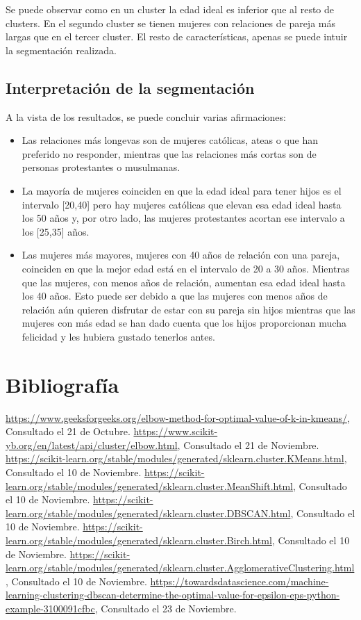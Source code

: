 \documentclass[paper=a4, fontsize=12pt]{article} %
\numberwithin{equation}{section} %
\numberwithin{figure}{section} %
\numberwithin{table}{section} %
\begin{document}
Se puede observar como en un cluster la edad ideal es inferior que al resto de clusters. En el segundo cluster se tienen mujeres con relaciones de pareja más largas que en el tercer cluster. El resto de características, apenas se puede intuir la segmentación realizada.
\subsection{Interpretación de la segmentación}

A la vista de los resultados, se puede concluir varias afirmaciones:
\begin{itemize}
\item Las relaciones más longevas son de mujeres católicas, ateas o que han preferido no responder, mientras que las relaciones más cortas son de personas protestantes o musulmanas.
\item La mayoría de mujeres coinciden en que la edad ideal para tener hijos es el intervalo [20,40] pero hay mujeres católicas que elevan esa edad ideal hasta los 50 años y, por otro lado, las mujeres protestantes acortan ese intervalo a los [25,35] años.
\item Las mujeres más mayores, mujeres con 40 años de relación con una pareja, coinciden en que la mejor edad está en el intervalo de 20 a 30 años. Mientras que las mujeres, con menos años de relación, aumentan esa edad ideal hasta los 40 años. Esto puede ser debido a que las mujeres con menos años de relación aún quieren disfrutar de estar con su pareja sin hijos mientras que las mujeres con más edad se han dado cuenta que los hijos proporcionan mucha felicidad y les hubiera gustado tenerlos antes.
\end{itemize}
\section{Bibliografía}

\begin{thebibliography}{0}
   \url {https://www.geeksforgeeks.org/elbow-method-for-optimal-value-of-k-in-kmeans/}, Consultado el 21 de Octubre.
   \url {https://www.scikit-yb.org/en/latest/api/cluster/elbow.html}, Consultado el 21 de Noviembre.
 \url {https://scikit-learn.org/stable/modules/generated/sklearn.cluster.KMeans.html}, Consultado el 10 de Noviembre.
 \url {https://scikit-learn.org/stable/modules/generated/sklearn.cluster.MeanShift.html}, Consultado el 10 de Noviembre.
 \url {https://scikit-learn.org/stable/modules/generated/sklearn.cluster.DBSCAN.html}, Consultado el 10 de Noviembre.
 \url {https://scikit-learn.org/stable/modules/generated/sklearn.cluster.Birch.html}, Consultado el 10 de Noviembre.
 \url {https://scikit-learn.org/stable/modules/generated/sklearn.cluster.AgglomerativeClustering.html}, Consultado el 10 de Noviembre.
 \url {https://towardsdatascience.com/machine-learning-clustering-dbscan-determine-the-optimal-value-for-epsilon-eps-python-example-3100091cfbc}, Consultado el 23 de Noviembre.
\end{thebibliography}
\end{document}

